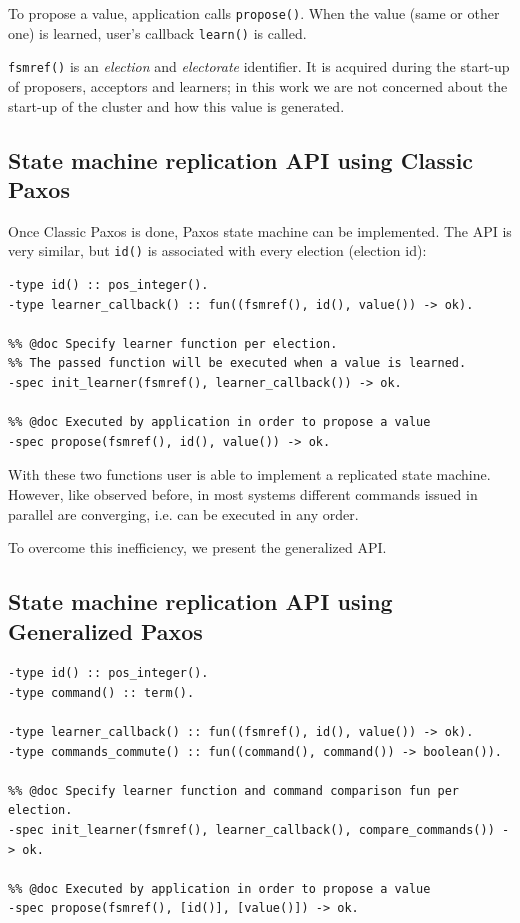 \documentclass[english,11pt]{l4proj}
\begin{document}
To propose a value, application calls {\tt propose()}. When the value (same or
other one) is learned, user's callback {\tt learn()} is called.

{\tt fsmref()} is an \emph{election} and \emph{electorate} identifier. It is
acquired during the start-up of proposers, acceptors and learners; in this work
we are not concerned about the start-up of the cluster and how this value is
generated.

\subsection{State machine replication API using Classic Paxos}

Once Classic Paxos is done, Paxos state machine can be implemented. The API is
very similar, but {\tt id()} is associated with every election (election id):

\begin{verbatim}
-type id() :: pos_integer().
-type learner_callback() :: fun((fsmref(), id(), value()) -> ok).

%% @doc Specify learner function per election.
%% The passed function will be executed when a value is learned.
-spec init_learner(fsmref(), learner_callback()) -> ok.

%% @doc Executed by application in order to propose a value
-spec propose(fsmref(), id(), value()) -> ok.
\end{verbatim}

With these two functions user is able to implement a replicated state machine.
However, like observed before, in most systems different commands issued in
parallel are converging, i.e. can be executed in any order.

To overcome this inefficiency, we present the generalized API.

\subsection{State machine replication API using Generalized Paxos}

\begin{verbatim}
-type id() :: pos_integer().
-type command() :: term().

-type learner_callback() :: fun((fsmref(), id(), value()) -> ok).
-type commands_commute() :: fun((command(), command()) -> boolean()).

%% @doc Specify learner function and command comparison fun per election.
-spec init_learner(fsmref(), learner_callback(), compare_commands()) -> ok.

%% @doc Executed by application in order to propose a value
-spec propose(fsmref(), [id()], [value()]) -> ok.
\end{verbatim}
\end{document}

